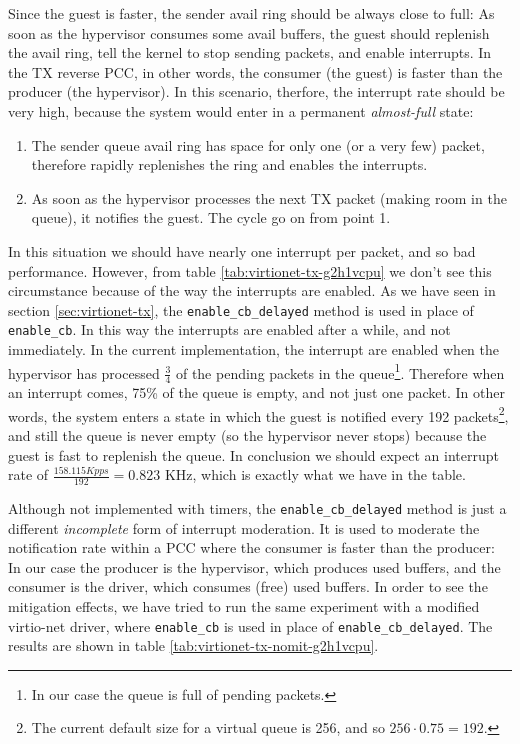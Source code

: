 Since the guest is faster, the sender avail ring
should be always close to full: As soon as the hypervisor consumes some avail buffers, the guest should replenish the avail ring, tell the 
kernel to stop sending packets, and enable interrupts. In the TX reverse PCC, in other words, the consumer (the guest) is faster than the
producer (the hypervisor).
In this scenario, therfore, the interrupt rate should be very high, because the system would
enter in a permanent \emph{almost-full} state:
\begin{enumerate}
  \item The sender queue avail ring has space for only one (or a very few) packet, therefore rapidly replenishes the ring and enables the
	interrupts.
  \item As soon as the hypervisor processes the next TX packet (making room in the queue), it notifies the guest. The cycle go on from
	point 1.
\end{enumerate}
In this situation we should have nearly one interrupt per packet, and so bad performance. However, from table 
\ref{tab:virtionet-tx-g2h1vcpu} we don't see this circumstance because of the way the interrupts are enabled. As we have seen in 
section \ref{sec:virtionet-tx}, the \texttt{enable\_cb\_delayed} method is used in place of \texttt{enable\_cb}. In this way the interrupts
are enabled after a while, and not immediately. In the current implementation, the interrupt are enabled when the hypervisor has processed
$\frac{3}{4}$ of the pending packets in the queue\footnote{In our case the queue is full of pending packets.}. Therefore when an interrupt
comes, 75\% of the queue is empty, and not just one packet. In other words, the system enters a state in which the guest is notified every
192 packets\footnote{The current default size for a virtual queue is 256, and so $256 \cdot 0.75 = 192$.}, and still the queue is never
empty (so the hypervisor never stops) because the guest is fast to replenish the queue. In conclusion we should expect an interrupt rate of
$\frac{158.115 Kpps}{192} = 0.823$ KHz, which is exactly what we have in the table.

\vspace{0.5cm}

Although not implemented with timers, the \texttt{enable\_cb\_delayed} method is just a different \emph{incomplete} form of interrupt 
moderation.
It is used to moderate the notification rate within a PCC where the consumer is faster than the producer: In our case
the producer is the hypervisor, which produces used buffers, and the consumer is the driver, which consumes (free) used buffers.
In order to see the mitigation effects, we have tried to run the same experiment with a modified virtio-net driver, where \texttt{enable\_cb}
is used in place of \texttt{enable\_cb\_delayed}. The results are shown in table \ref{tab:virtionet-tx-nomit-g2h1vcpu}.

